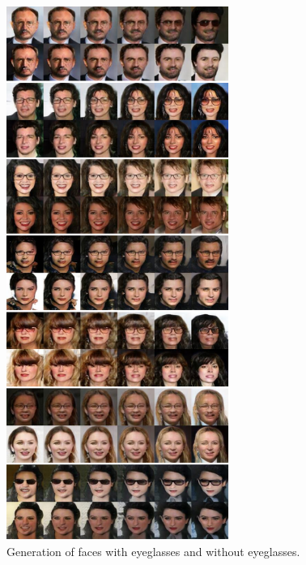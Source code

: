 \begin{figure}[thb!]
\centering
\includegraphics[trim=0in 0in 0in 0in, width=0.65\textwidth]{result_face_eyeglasses_big3.pdf}
\caption{Generation of faces with eyeglasses and without eyeglasses.}
\label{fig::result_eyeglass3}
\end{figure}

